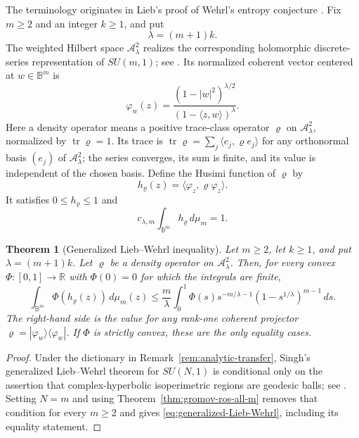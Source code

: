 \documentclass[11pt,reqno]{amsart}
\numberwithin{equation}{section}
\newtheorem{theorem}{Theorem}[section]
\theoremstyle{definition}
\theoremstyle{remark}
\begin{document}
The terminology originates in Lieb's proof of Wehrl's entropy conjecture
\cite{Lieb1978}. Fix \(m\ge2\) and an integer \(k\ge1\), and put
\[
 \lambda=(m+1)k.
\]
The weighted Hilbert space $\mathcal A^2_\lambda$ realizes the corresponding
holomorphic discrete-series representation of $SU(m,1)$; see
\cite{Singh2026}.  Its normalized
coherent vector centered at $w\in\mathbb B^m$ is
\[
 \varphi_w(z)=
 \frac{(1-|w|^2)^{\lambda/2}}{(1-\langle z,w\rangle)^\lambda}.
\]
Here a density operator means a positive trace-class operator \(\varrho\) on
\(\mathcal A^2_\lambda\), normalized by \(\operatorname{tr}\varrho=1\).  Its
trace is
\(\operatorname{tr}\varrho=\sum_j\langle e_j,\varrho e_j\rangle\) for any
orthonormal basis \((e_j)\) of \(\mathcal A^2_\lambda\); the series converges,
its sum is finite, and its value is independent of the chosen basis.  Define
the Husimi function of \(\varrho\) by
\[
 h_\varrho(z)=\langle\varphi_z,\varrho\varphi_z\rangle.
\]
It satisfies $0\le h_\varrho\le1$ and
\[
 c_{\lambda,m}\int_{\mathbb B^m}h_\varrho\,d\mu_m=1.
\]

\begin{theorem}[Generalized Lieb--Wehrl inequality]
\label{thm:Lieb-Wehrl-SUm1}
Let \(m\ge2\), let \(k\ge1\), and put \(\lambda=(m+1)k\).
Let \(\varrho\) be a density operator on \(\mathcal A^2_\lambda\).
Then, for every convex
\(\Phi:[0,1]\to\mathbb R\) with
{\(\Phi(0)=0\)} for which the integrals are finite,
\begin{equation}
 \int_{\mathbb B^m}\Phi(h_\varrho(z))\,d\mu_m(z)
 \le
 \frac{m}{\lambda}\int_0^1
 \Phi(s)s^{-m/\lambda-1}
 \left(1-s^{1/\lambda}\right)^{m-1}\,ds.
 \label{eq:generalized-Lieb-Wehrl}
\end{equation}
The right-hand side is the value for any rank-one coherent projector
$\varrho=|\varphi_w\rangle\langle\varphi_w|$.  If $\Phi$ is strictly
convex, these are the only equality cases.
\end{theorem}

\begin{proof}
Under the dictionary in Remark~\ref{rem:analytic-transfer}, Singh's
generalized Lieb--Wehrl theorem for $SU(N,1)$ is conditional only
on the assertion that complex-hyperbolic isoperimetric regions are
geodesic balls; see \cite[Theorems~A and B]{Singh2026}.  Setting $N=m$ and
using Theorem~\ref{thm:gromov-ros-all-m} removes that condition for every
\(m\ge2\) and gives
\eqref{eq:generalized-Lieb-Wehrl}, including its equality statement.
\end{proof}
\end{document}

